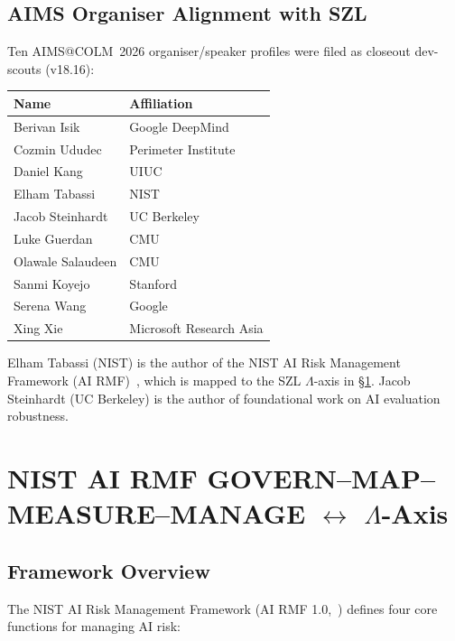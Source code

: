 \subsection{AIMS Organiser Alignment with SZL}
\label{ssec:aims-organiser-alignment}

Ten AIMS@COLM~2026 organiser/speaker profiles were filed as closeout
dev-scouts (v18.16):

\begin{center}
\begin{tabular}{ll}
\textbf{Name} & \textbf{Affiliation} \\
\hline
Berivan Isik & Google DeepMind \\
Cozmin Ududec & Perimeter Institute \\
Daniel Kang & UIUC \\
Elham Tabassi & NIST \\
Jacob Steinhardt & UC Berkeley \\
Luke Guerdan & CMU \\
Olawale Salaudeen & CMU \\
Sanmi Koyejo & Stanford \\
Serena Wang & Google \\
Xing Xie & Microsoft Research Asia \\
\end{tabular}
\end{center}

Elham Tabassi (NIST) is the author of the NIST AI Risk Management Framework
(AI RMF)~\cite{nist_ai_rmf}, which is mapped to the SZL $\Lambda$-axis in
\S\ref{sec:nist-rmf}.  Jacob Steinhardt (UC Berkeley) is the author of
foundational work on AI evaluation robustness.

\section{NIST AI RMF GOVERN--MAP--MEASURE--MANAGE $\leftrightarrow$ $\Lambda$-Axis}
\label{sec:nist-rmf}

\subsection{Framework Overview}
\label{ssec:nist-rmf-overview}

The NIST AI Risk Management Framework (AI RMF 1.0,~\cite{nist_ai_rmf}) defines
four core functions for managing AI risk:

